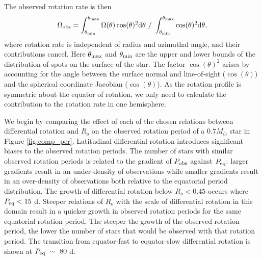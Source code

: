 The observed rotation rate is then
\begin{equation}
\label{eq:inte}
	\Omega_{\rm{obs}} = \int^{\theta_{\rm{max}}}_{\theta_{\rm{min}}} \Omega(\theta) \cos(\theta)^2 \rm{d}\theta \ / \ \int^{\theta_{\rm{max}}}_{\theta_{\rm{min}}} \cos(\theta)^2 \rm{d}\theta,
\end{equation}
where rotation rate is independent of radius and azimuthal angle, and their contributions cancel.
Here $\theta_{\rm{max}}$ and $\theta_{\rm{min}}$ are the upper and lower bounds of the distribution of spots on the surface of the star.
The factor $\cos(\theta)^2$ arises by accounting for the angle between the surface normal and line-of-sight ($\cos(\theta)$) and the spherical coordinate Jacobian ($\cos(\theta)$).
As the rotation profile is symmetric about the equator of rotation, we only need to calculate the contribution to the rotation rate in one hemisphere.

We begin by comparing the effect of each of the chosen relations between differential rotation and $R_o$ on the observed rotation period of a $0.7 M_{\odot}$ star in Figure \ref{fig:comp_per}.
Latitudinal differential rotation introduces significant biases to the observed rotation periods.
The number of stars with similar observed rotation periods is related to the gradient of $P_{\rm{obs}}$ against $P_{\rm{eq}}$: larger gradients result in an under-density of observations while smaller gradients result in an over-density of observations both relative to the equatorial period distribution.
The growth of differential rotation below $R_o < 0.45$ occurs where $P_{\rm{eq}} < 15$ d.
Steeper relations of $R_o$ with the scale of differential rotation in this domain result in a quicker growth in observed rotation periods for the same equatorial rotation period.
The steeper the growth of the observed rotation period, the lower the number of stars that would be observed with that rotation period.
The transition from equator-fast to equator-slow differential rotation is shown at $P_{\rm{eq}} \ \sim \ 80$ d.

